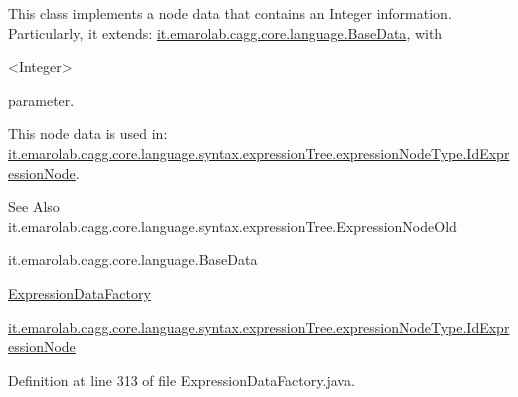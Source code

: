 This class implements a node data that contains an Integer information. Particularly, it extends\-: \hyperlink{}{it.\-emarolab.\-cagg.\-core.\-language.\-Base\-Data}, with
\begin{DoxyCode}
<Integer> 
\end{DoxyCode}
 parameter.\par
 This node data is used in\-: \hyperlink{classit_1_1emarolab_1_1cagg_1_1core_1_1language_1_1syntax_1_1expressionTree_1_1expressionNodeType_1_1IdExpressionNode}{it.\-emarolab.\-cagg.\-core.\-language.\-syntax.\-expression\-Tree.\-expression\-Node\-Type.\-Id\-Expression\-Node}. 

\begin{DoxySeeAlso}{See Also}
it.\-emarolab.\-cagg.\-core.\-language.\-syntax.\-expression\-Tree.\-Expression\-Node\-Old 

it.\-emarolab.\-cagg.\-core.\-language.\-Base\-Data 

\hyperlink{classit_1_1emarolab_1_1cagg_1_1core_1_1language_1_1syntax_1_1expressionTree_1_1ExpressionDataFactory}{Expression\-Data\-Factory} 

\hyperlink{classit_1_1emarolab_1_1cagg_1_1core_1_1language_1_1syntax_1_1expressionTree_1_1expressionNodeType_1_1IdExpressionNode}{it.\-emarolab.\-cagg.\-core.\-language.\-syntax.\-expression\-Tree.\-expression\-Node\-Type.\-Id\-Expression\-Node} 
\end{DoxySeeAlso}


Definition at line 313 of file Expression\-Data\-Factory.\-java.



